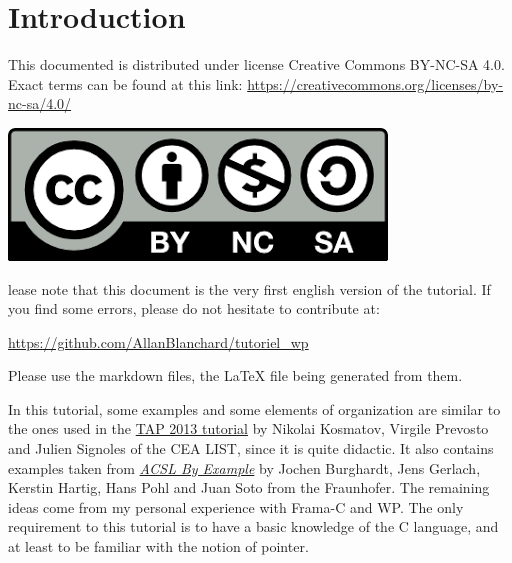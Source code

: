 \documentclass[12pt,francais,]{scrbook}
\title{\color{white}{INTRODUCTION TO C PROGRAM PROOF USING FRAMA-C AND ITS WP PLUGIN}}
\author{\color{ocre}{Allan Blanchard}}
\date{\color{white}{$ $\\December 2017}}
\newenvironment{zdsalertblock}[1]{%
  \tcolorbox[beamer,%
    noparskip,breakable,
    colback=LightCoral,colframe=DarkRed,%
    colbacklower=Tomato,%
    title=#1]
}{\endtcolorbox}
\newenvironment{zdsblock}[1]{%
  \tcolorbox[beamer,%
    noparskip,breakable,
    colback=LightBlue,colframe=DarkBlue,%
    colbacklower=DarkBlue,%
    title=#1]
}{\endtcolorbox}
\begin{document}
\maketitle
\ClearWallPaper

{
\hypersetup{linkcolor=ocre}
\setcounter{tocdepth}{2}
\tableofcontents
}
\chapter{Introduction}\label{introduction}

\begin{zdsblock}{License}
  This documented is distributed under license Creative Commons BY-NC-SA 4.0.
  Exact terms can be found at this link:
  \href{https://creativecommons.org/licenses/by-nc-sa/4.0/}
       {https://creativecommons.org/licenses/by-nc-sa/4.0/}
  \begin{center}
    \includegraphics[width=.3\textwidth]{cc-by-nc-sa.png}
  \end{center}
\end{zdsblock}

\begin{zdsalertblock}
  Please note that this document is the very first english version of the
  tutorial. If you find some errors, please do not hesitate to contribute at:

  \href{https://github.com/AllanBlanchard/tutoriel_wp}{https://github.com/AllanBlanchard/tutoriel\_wp}

  Please use the markdown files, the LaTeX file being generated from them.
\end{zdsalertblock}

\begin{zdsblock}{Information}
  In this tutorial, some examples and some elements of organization are
  similar to the ones used in the \href{http://www.spacios.eu/TAP2013/keynotes.html}{TAP 2013
    tutorial} by Nikolai Kosmatov, Virgile Prevosto and Julien
  Signoles of the CEA LIST, since it is quite didactic. It also
  contains examples taken from
  \emph{\href{http://www.fokus.fraunhofer.de/download/acsl_by_example}{ACSL By Example}}
  by Jochen Burghardt, Jens Gerlach, Kerstin Hartig, Hans Pohl and Juan
  Soto from the Fraunhofer. The remaining ideas come from my personal
  experience with Frama-C and WP. The only requirement to this tutorial
  is to have a basic knowledge of the C language, and at least to
  be familiar with the notion of pointer.
\end{zdsblock}
\end{document}
